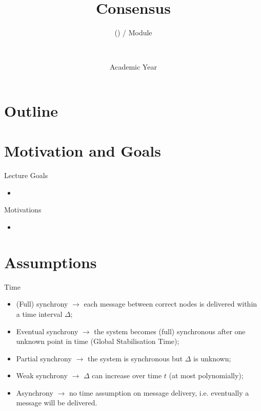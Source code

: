 \documentclass[presentation]{beamer}\mode<presentation>{\usetheme{AMSBolognaFC}}
\title[\currentLab{} -- Consensus]{
	Consensus
}
\subtitle{\courseName{} (\courseAcronym) / Module \moduleN{}}
\author[\sspeaker{\mmShort} \& \gcShort]{
	\speaker{\mmFull} \and \gcFull
	\\ 
	\mmEmail \and \gcEmail
}
\institute[\disiShort, \uniboShort]{\disi{} (\disiShort)\\\unibo}
\date[A.Y. \academicYear{}]{Academic Year \academicYear{}}
\begin{document}

\frame{\titlepage}

\section*{Outline}
%
\frame[c]{\tableofcontents[hideallsubsections]}

\section{Motivation and Goals}

\begin{frame}{Lecture Goals}
	\begin{itemize}
		\item 
	\end{itemize}
\end{frame}

\begin{frame}{Motivations}
	\begin{itemize}
		\item 
	\end{itemize}
\end{frame}

\section{Assumptions}

\begin{frame}{Time}
	\begin{itemize}
		\item (Full) synchrony $\rightarrow$ each message between correct nodes is delivered within a time interval $\Delta$;
        \item Eventual synchrony $\rightarrow$ the system becomes (full) synchronous after one unknown point in time (Global Stabilisation Time);
        \item Partial synchrony $\rightarrow$ the system is synchronous but $\Delta$ is unknown;
        \item Weak synchrony $\rightarrow$ $\Delta$ can increase over time $t$ (at most polynomially);
        \item Asynchrony $\rightarrow$ no time assumption on message delivery, i.e. eventually a message will be delivered.
	\end{itemize}
\end{frame}
\end{document}
